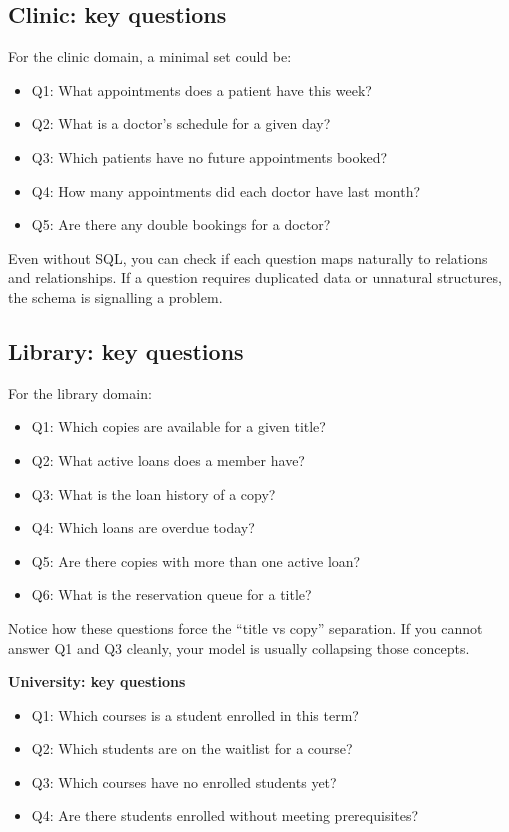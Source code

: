 \subsection{Clinic: key questions}
For the clinic domain, a minimal set could be:
\begin{itemize}
  \item Q1: What appointments does a patient have this week?
  \item Q2: What is a doctor’s schedule for a given day?
  \item Q3: Which patients have no future appointments booked?
  \item Q4: How many appointments did each doctor have last month?
  \item Q5: Are there any double bookings for a doctor?
\end{itemize}

Even without SQL, you can check if each question maps naturally to relations and relationships.
If a question requires duplicated data or unnatural structures, the schema is signalling a problem.

\subsection{Library: key questions}
For the library domain:
\begin{itemize}
  \item Q1: Which copies are available for a given title?
  \item Q2: What active loans does a member have?
  \item Q3: What is the loan history of a copy?
  \item Q4: Which loans are overdue today?
  \item Q5: Are there copies with more than one active loan?
  \item Q6: What is the reservation queue for a title?
\end{itemize}

Notice how these questions force the “title vs copy” separation.
If you cannot answer Q1 and Q3 cleanly, your model is usually collapsing those concepts.

\begin{examplebox}
\textbf{University: key questions}\par\smallskip
\begin{itemize}
  \item Q1: Which courses is a student enrolled in this term?
  \item Q2: Which students are on the waitlist for a course?
  \item Q3: Which courses have no enrolled students yet?
  \item Q4: Are there students enrolled without meeting prerequisites?
\end{itemize}
\end{examplebox}

